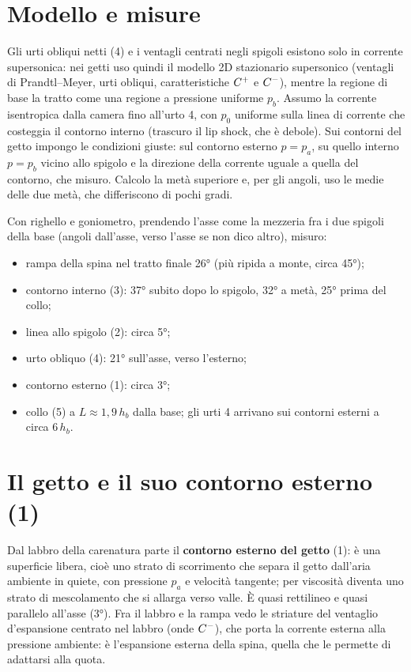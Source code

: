 
\section*{Modello e misure}
Gli urti obliqui netti (4) e i ventagli centrati negli spigoli esistono solo in corrente supersonica: nei getti uso
quindi il modello 2D stazionario supersonico (ventagli di Prandtl--Meyer, urti obliqui, caratteristiche $C^{+}$ e
$C^{-}$), mentre la regione di base la tratto come una regione a pressione uniforme $p_b$. Assumo la corrente
isentropica dalla camera fino all'urto 4, con $p_0$ uniforme sulla linea di corrente che costeggia il contorno interno
(trascuro il lip shock, che è debole). Sui contorni del getto impongo le condizioni giuste: sul contorno esterno
$p=p_a$, su quello interno $p=p_b$ vicino allo spigolo e la direzione della corrente uguale a quella del contorno,
che misuro. Calcolo la metà superiore e, per gli angoli, uso le medie delle due metà, che differiscono di pochi gradi.

Con righello e goniometro, prendendo l'asse come la mezzeria fra i due spigoli della base (angoli dall'asse, verso
l'asse se non dico altro), misuro:
\begin{itemize}
\item rampa della spina nel tratto finale \ang{26} (più ripida a monte, circa \ang{45});
\item contorno interno (3): \ang{37} subito dopo lo spigolo, \ang{32} a metà, \ang{25} prima del collo;
\item linea allo spigolo (2): circa \ang{5};
\item urto obliquo (4): \ang{21} sull'asse, verso l'esterno;
\item contorno esterno (1): circa \ang{3};
\item collo (5) a $L\approx1{,}9\,h_b$ dalla base; gli urti 4 arrivano sui contorni esterni a circa $6\,h_b$.
\end{itemize}

\section*{Il getto e il suo contorno esterno (1)}
Dal labbro della carenatura parte il \textbf{contorno esterno del getto} (1): è una superficie libera, cioè uno strato
di scorrimento che separa il getto dall'aria ambiente in quiete, con pressione $p_a$ e velocità tangente; per
viscosità diventa uno strato di mescolamento che si allarga verso valle. È quasi rettilineo e quasi parallelo
all'asse (\ang{3}). Fra il labbro e la rampa vedo le striature del ventaglio d'espansione centrato nel labbro (onde
$C^{-}$), che porta la corrente esterna alla pressione ambiente: è l'espansione esterna della spina, quella che le
permette di adattarsi alla quota.

